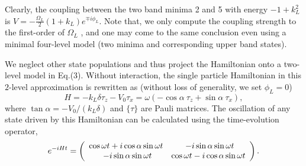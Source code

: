 \documentclass[twocolumn,prl,floatfix,citeautoscript,nofootinbib,superscriptaddress]{revtex4}
\begin{document}
Clearly, the coupling between the two band minima 2 and 5 with energy $%
-1+k_{L}^{2}$ is $V=-\frac{\Omega _{L}}{2}(1+k_{L})e^{\mp i\phi _{L}}$. Note
that, we only compute the coupling strength to the first-order of $\Omega_L$%
, and one may come to the same conclusion even using a minimal four-level
model (two minima and corresponding upper band states).

We neglect other state populations and thus project the Hamiltonian onto a
two-level model in Eq.(3). Without interaction, the single particle
Hamiltonian in this $2$-level approximation is rewritten as (without loss of
generality, we set $\phi _{L}=0$)
\begin{equation*}
H=-k_{L}\delta {\tau _{z}}-V_{0}{\tau _{x}}=\omega (-\cos \alpha ~{\tau _{z}}%
+\sin \alpha ~{\tau _{x}}),
\end{equation*}%
where $\tan \alpha =-V_{0}/(k_{L}\delta )$ and $\{{\tau }\}$ are Pauli
matrices. The oscillation of any state driven by this Hamiltonian can be
calculated using the time-evolution operator,
\begin{equation*}
{e^{-iHt}}=\left( {%
\begin{array}{cc}
{\cos \omega t+i\cos \alpha \sin \omega t} & {\ -i\sin \alpha \sin \omega t}
\\
{\ -i\sin \alpha \sin \omega t} & {\cos \omega t-i\cos \alpha \sin \omega t}%
\end{array}%
}\right) .
\end{equation*}
\end{document}
